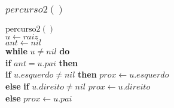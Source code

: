 \documentclass{beamer}
\begin{document}
\begin{frame}[shrink]
\frametitle{$percurso2()$}
\begin{oframed}
\begin{flushleft}
\hspace*{1em} \ensuremath{\mathrm{percurso2}()}\\
\hspace*{1em} \hspace*{1em} \ensuremath{\ensuremath{\mathit{u}} \gets  \ensuremath{raiz}}\\
\hspace*{1em} \hspace*{1em} \ensuremath{\ensuremath{\mathit{ant}} \gets  \ensuremath{nil}}\\
\hspace*{1em} \hspace*{1em} {\color{black} \textbf{while}} \ensuremath{\ensuremath{\mathit{u}} \ne nil} {\color{black} \textbf{do}} \\
\hspace*{1em} \hspace*{1em} \hspace*{1em} {\color{black} \textbf{if}} \ensuremath{\ensuremath{\mathit{ant}} =\ensuremath{\mathit{u}}.pai} {\color{black} \textbf{then}} \\
\hspace*{1em} \hspace*{1em} \hspace*{1em} \hspace*{1em} {\color{black} \textbf{if}} \ensuremath{\ensuremath{\mathit{u}}.\ensuremath{\mathit{esquerdo}} \ne nil} {\color{black} \textbf{then}}  \ensuremath{\ensuremath{\mathit{prox}} \gets  \ensuremath{\ensuremath{\mathit{u}}.esquerdo}}\\
\hspace*{1em} \hspace*{1em} \hspace*{1em} \hspace*{1em} {\color{black} \textbf{else}} {\color{black} \textbf{if}} \ensuremath{\ensuremath{\mathit{u}}.\ensuremath{\mathit{direito}} \ne nil} \ensuremath{\ensuremath{\mathit{prox}} \gets  \ensuremath{\ensuremath{\mathit{u}}.direito}}\\
\hspace*{1em} \hspace*{1em} \hspace*{1em} \hspace*{1em} {\color{black} \textbf{else}}  \ensuremath{\ensuremath{\mathit{prox}} \gets  \ensuremath{\ensuremath{\mathit{u}}.pai}}\\

\end{flushleft}
\end{oframed}
\end{frame}
\end{document}
